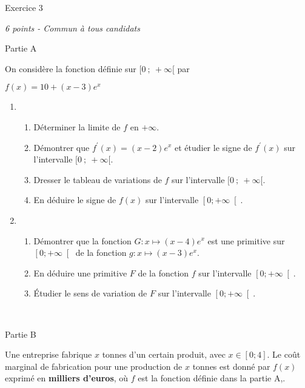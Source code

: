
%
\begin{h2}Exercice 3\end{h2}
\textit{6 points - Commun à tous candidats }
\begin{h3}Partie A\end{h3}
On considère la fonction définie sur $ [ 0~;~+\infty [ $ par

\begin{center}
$f\left(x\right)= 10+\left(x-3\right)e^{x}$
\end{center}

\begin{enumerate}
     \item
     \begin{enumerate}[label=\alph*.]
          \item
          Déterminer la limite de $f$ en $+ \infty $.
          \item
          Démontrer que $f^{\prime}\left(x\right)=\left(x-2\right)e^{x}$ et étudier le signe de $f^{\prime}\left(x\right)$ sur l'intervalle $ [ 0~;~+\infty [ $.
          \item
          Dresser le tableau de variations de $ f $ sur l'intervalle $ [ 0~;~+\infty [ $.
          \item
          En déduire le signe de $f\left(x\right)$ sur l'intervalle $\left[0  ; +\infty \right[$.
     \end{enumerate}
     \item
     \begin{enumerate}[label=\alph*.]
          \item
          Démontrer que la fonction $G : x \mapsto   \left(x-4 \right)e^{x}$ est une primitive sur $\left[0  ; +\infty \right[$ de la fonction $g : x \mapsto  \left(x-3 \right)e^{x}$.
          \item
          En déduire une primitive $F$ de la fonction $f$ sur l'intervalle $\left[0  ; +\infty \right[$.
          \item
          Étudier le sens de variation de $F$ sur l'intervalle $\left[0  ; +\infty \right[$.
     \end{enumerate}
\end{enumerate}
 
\begin{h3}Partie B\end{h3}
Une entreprise fabrique $x$ tonnes d'un certain produit, avec $x\in \left[0  ; 4\right]$. Le coût marginal de fabrication pour une production de $x$ tonnes est donné par $f\left(x\right)$ exprimé en \textbf{milliers d'euros}, où $f$ est la fonction définie dans la partie A,.
